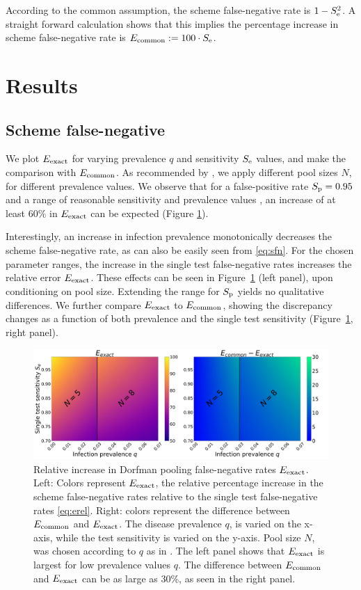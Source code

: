 \documentclass{article}
\begin{document}
According to the common assumption, the scheme false-negative rate is
$1-S_\text{e}^2$. A straight forward calculation shows that this implies the percentage
increase in scheme false-negative rate is $E_{\text{{common}}} := 100\cdot
S_\text{e}$.

\section*{Results}\label{section:results}
\subsection*{Scheme false-negative}
We plot $E_{\text{{exact}}}$ for varying prevalence $q$ and sensitivity $S_\text{e}$
values, and make the comparison with $E_{\text{{common}}}$. As recommended by
\cite{DorfmanYuvalDor}, we apply different pool sizes $N$, for
different prevalence values. We observe that for a false-positive rate
$S_\text{p}=0.95$ \cite{DorfmanYuvalDor} and a range of reasonable
sensitivity and prevalence values \cite{KitComparison,
  InterpretingCOVID19Test, EstimatingRatesLourenco,
  FalsePositiveEstimate}, an increase of at least $60\%$ in
$E_{\text{{exact}}}$ can be expected (Figure \ref{fig1}).

Interestingly, an increase in infection prevalence monotonically
decreases the scheme false-negative rate, as can also be easily seen
from \eqref{eq:sfn}. For the chosen parameter ranges, the increase in
the single test false-negative rates increases the relative error
$E_{\text{{exact}}}$. These effects can be seen in Figure~\ref{fig1} (left
panel), upon conditioning on pool size. Extending the range for $S_\text{p}$
yields no qualitative differences. We further compare $E_{\text{{exact}}}$ to
$E_{\text{{common}}}$, showing the discrepancy changes as a function of both
prevalence and the single test sensitivity (Figure~\ref{fig1}, right
panel).
\begin{figure}[H]
  \centering
  \includegraphics[width=\textwidth]{heatmap_sfn.jpg}
  \caption{Relative increase in Dorfman pooling false-negative rates
    $E_{\text{{exact}}}$. Left: Colors represent $E_{\text{{exact}}}$, the relative
    percentage increase in the scheme false-negative rates relative
    to the single test false-negative rates \eqref{eq:erel}. Right: colors represent the difference between
    $E_{\text{{common}}}$ and $E_{\text{{exact}}}$. The disease prevalence $q$, is
    varied on the x-axis, while the test sensitivity is varied on
    the y-axis. Pool size $N$, was chosen according to $q$ as in
    \cite{DorfmanYuvalDor}. The left panel shows that $E_{\text{{exact}}}$ is largest for low prevalence values $q$. The difference between $E_{\text{{common}}}$ and $E_{\text{{exact}}}$
    can be as large as 30\%, as seen in the right panel. }\label{fig1}
\end{figure}
\end{document}

